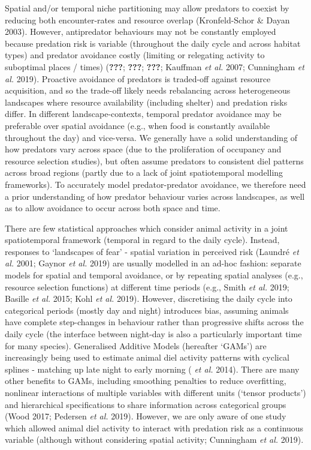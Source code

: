 \documentclass[11pt,a4paper,titlepage,twoside,openright]{style/unimelbthesis}
\begin{document}
\begin{mainmatter}
Spatial and/or temporal niche partitioning may allow predators to coexist by reducing both encounter-rates and resource overlap (Kronfeld-Schor \& Dayan 2003). However, antipredator behaviours may not be constantly employed because predation risk is variable (throughout the daily cycle and across habitat types) and predator avoidance costly (limiting or relegating activity to suboptimal places / times) ({\textbf{???}}; {\textbf{???}}; {\textbf{???}}; Kauffman \emph{et al.} 2007; Cunningham \emph{et al.} 2019). Proactive avoidance of predators is traded-off against resource acquisition, and so the trade-off likely needs rebalancing across heterogeneous landscapes where resource availability (including shelter) and predation risks differ. In different landscape-contexts, temporal predator avoidance may be preferable over spatial avoidance (e.g., when food is constantly available throughout the day) and vice-versa. We generally have a solid understanding of how predators vary across space (due to the proliferation of occupancy and resource selection studies), but often assume predators to consistent diel patterns across broad regions (partly due to a lack of joint spatiotemporal modelling frameworks). To accurately model predator-predator avoidance, we therefore need a prior understanding of how predator behaviour varies across landscapes, as well as to allow avoidance to occur across both space and time.

There are few statistical approaches which consider animal activity in a joint spatiotemporal framework (temporal in regard to the daily cycle). Instead, responses to `landscapes of fear' - spatial variation in perceived risk (Laundré \emph{et al.} 2001; Gaynor \emph{et al.} 2019) are usually modelled in an ad-hoc fashion: separate models for spatial and temporal avoidance, or by repeating spatial analyses (e.g., resource selection functions) at different time periods (e.g., Smith \emph{et al.} 2019; Basille \emph{et al.} 2015; Kohl \emph{et al.} 2019). However, discretising the daily cycle into categorical periods (mostly day and night) introduces bias, assuming animals have complete step-changes in behaviour rather than progressive shifts across the daily cycle (the interface between night-day is also a particularly important time for many species). Generalised Additive Models (hereafter `GAMs') are increasingly being used to estimate animal diel activity patterns with cyclical splines - matching up late night to early morning ( \emph{et al.} 2014). There are many other benefits to GAMs, including smoothing penalties to reduce overfitting, nonlinear interactions of multiple variables with different units (`tensor products') and hierarchical specifications to share information across categorical groups (Wood 2017; Pedersen \emph{et al.} 2019). However, we are only aware of one study which allowed animal diel activity to interact with predation risk as a continuous variable (although without considering spatial activity; Cunningham \emph{et al.} 2019).


\end{mainmatter}
\end{document}
